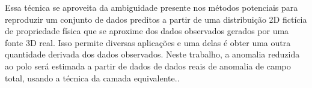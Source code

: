 Essa técnica se aproveita da ambiguidade presente nos métodos potenciais para reproduzir um conjunto de dados preditos a partir de uma distribuição 2D fictícia de propriedade física que se aproxime dos dados observados gerados por uma fonte 3D real. Isso permite diversas aplicações e uma delas é obter uma outra quantidade derivada dos dados observados. Neste trabalho, a  anomalia reduzida ao polo será estimada a partir de dados de dados reais de anomalia de campo total, usando a técnica da camada equivalente..